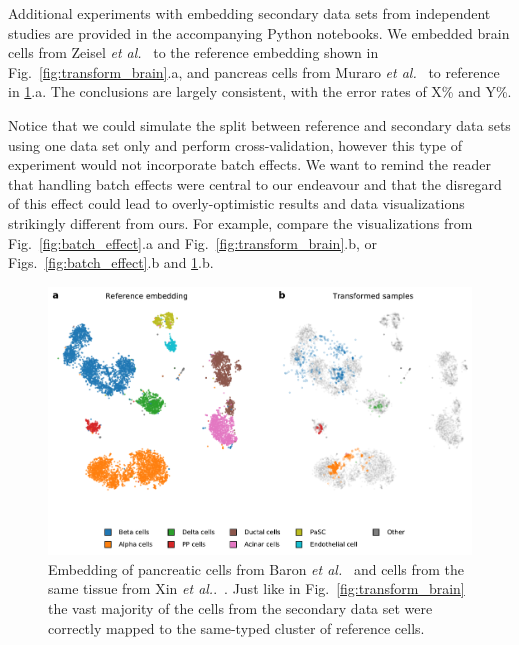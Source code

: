 \documentclass[runningheads]{llncs}
\newcommand{\etal}{\textit{et al.}}
\begin{document}
Additional experiments with embedding secondary data sets from independent
studies are provided in the accompanying Python notebooks. We embedded brain
cells from Zeisel \etal~\cite{zeisel2015} to the reference embedding shown in
Fig.~\ref{fig:transform_brain}.a, and pancreas cells from Muraro
\etal~\cite{muraro2016} to reference in \ref{fig:transform_pancreas}.a. The
conclusions are largely consistent, with the error rates of X\% and Y\%.

Notice that we could simulate the split between reference and secondary data
sets using one data set only and perform cross-validation, however this type of
experiment would not incorporate batch effects. We want to remind the reader
that handling batch effects were central to our endeavour and that the
disregard of this effect could lead to overly-optimistic results and data
visualizations strikingly different from ours. For example, compare the
visualizations from Fig.~\ref{fig:batch_effect}.a and
Fig.~\ref{fig:transform_brain}.b, or Figs.~\ref{fig:batch_effect}.b and
\ref{fig:transform_pancreas}.b.


\begin{figure}[htb]
  \includegraphics[width=\textwidth]{figures/transform_pancreas.pdf}
  \caption{Embedding of pancreatic cells from Baron \etal~\cite{baron2016} and
  cells from the same tissue from Xin \etal.~\cite{xin2016}. Just like in
  Fig.~\ref{fig:transform_brain} the vast majority of the cells from the
  secondary data set were correctly mapped to the same-typed cluster of
  reference cells.}
  \label{fig:transform_pancreas}
\end{figure}
\end{document}
